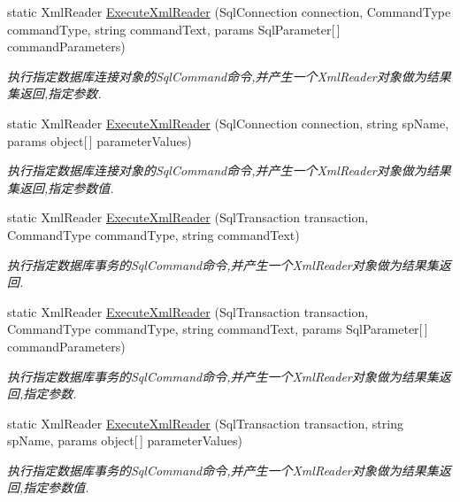 \begin{DoxyCompactItemize}
static Xml\-Reader \hyperlink{class_x_c_l_net_tools_1_1_data_base_1_1_m_s_s_q_l_1_1_sql_helper_ac7970d46deb6fa5d221863553ab3bf61}{Execute\-Xml\-Reader} (Sql\-Connection connection, Command\-Type command\-Type, string command\-Text, params Sql\-Parameter\mbox{[}$\,$\mbox{]} command\-Parameters)
\begin{DoxyCompactList}\small\item\em 执行指定数据库连接对象的\-Sql\-Command命令,并产生一个\-Xml\-Reader对象做为结果集返回,指定参数. \end{DoxyCompactList}\item 
static Xml\-Reader \hyperlink{class_x_c_l_net_tools_1_1_data_base_1_1_m_s_s_q_l_1_1_sql_helper_a35fe37ce15a3a35ae57115ec3f1f2602}{Execute\-Xml\-Reader} (Sql\-Connection connection, string sp\-Name, params object\mbox{[}$\,$\mbox{]} parameter\-Values)
\begin{DoxyCompactList}\small\item\em 执行指定数据库连接对象的\-Sql\-Command命令,并产生一个\-Xml\-Reader对象做为结果集返回,指定参数值. \end{DoxyCompactList}\item 
static Xml\-Reader \hyperlink{class_x_c_l_net_tools_1_1_data_base_1_1_m_s_s_q_l_1_1_sql_helper_accb62cca14e5aafed4dc7ac1158baafc}{Execute\-Xml\-Reader} (Sql\-Transaction transaction, Command\-Type command\-Type, string command\-Text)
\begin{DoxyCompactList}\small\item\em 执行指定数据库事务的\-Sql\-Command命令,并产生一个\-Xml\-Reader对象做为结果集返回. \end{DoxyCompactList}\item 
static Xml\-Reader \hyperlink{class_x_c_l_net_tools_1_1_data_base_1_1_m_s_s_q_l_1_1_sql_helper_a51e6d1104cc8108d3f06564a22daab7e}{Execute\-Xml\-Reader} (Sql\-Transaction transaction, Command\-Type command\-Type, string command\-Text, params Sql\-Parameter\mbox{[}$\,$\mbox{]} command\-Parameters)
\begin{DoxyCompactList}\small\item\em 执行指定数据库事务的\-Sql\-Command命令,并产生一个\-Xml\-Reader对象做为结果集返回,指定参数. \end{DoxyCompactList}\item 
static Xml\-Reader \hyperlink{class_x_c_l_net_tools_1_1_data_base_1_1_m_s_s_q_l_1_1_sql_helper_a1e648d5bc5a910f07379d5f63b623393}{Execute\-Xml\-Reader} (Sql\-Transaction transaction, string sp\-Name, params object\mbox{[}$\,$\mbox{]} parameter\-Values)
\begin{DoxyCompactList}\small\item\em 执行指定数据库事务的\-Sql\-Command命令,并产生一个\-Xml\-Reader对象做为结果集返回,指定参数值. \end{DoxyCompactList}\item 

\end{DoxyCompactItemize}
